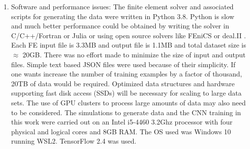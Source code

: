 \documentclass[12pt]{article}
\begin{document}
\begin{enumerate}
\item{Software and performance issues: The finite element solver and associated scripts for generating the data were written in Python 3.8. Python is slow and much better performance could be obtained by writing the solver in C/C++/Fortran or Julia or using open source solvers like FEniCS \cite{paper:fenics} or deal.II \cite{misc:deal.ii}. Each FE input file is 3.3MB and output file is 1.1MB and total dataset size is $\approx$  20GB. There was no effort made to minimize the size of input and output files. Simple text based JSON files were used because of their simplicity. If one wants increase the number of training examples by a factor of thousand, 20TB of data would be required. Optimized data structures and hardware supporting fast disk access (SSDs) will be necessary for scaling to large data sets. The use of GPU clusters to process large amounts of data may also need to be considered. The simulations to generate data and the CNN training in this work were carried out on an Intel i5-4460 3.2Ghz processor with four physical and logical cores and 8GB RAM. The OS used was Windows 10 running WSL2. TensorFlow 2.4 was used.}
\end{enumerate}
\clearpage
{}

\end{document}
